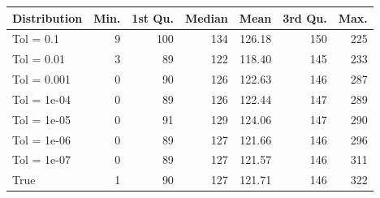 \begin{figure} 
\begin{tabular}{lrrrrrr}
 Distribution & Min. & 1st Qu. & Median & Mean & 3rd Qu. & Max. \\ 
  \hline
\hline
Tol =  0.1 & 9 & 100 & 134 & 126.18 & 150 & 225 \\ 
  Tol =  0.01 & 3 & 89 & 122 & 118.40 & 145 & 233 \\ 
  Tol =  0.001 & 0 & 90 & 126 & 122.63 & 146 & 287 \\ 
  Tol =  1e-04 & 0 & 89 & 126 & 122.44 & 147 & 289 \\ 
  Tol =  1e-05 & 0 & 91 & 129 & 124.06 & 147 & 290 \\ 
  Tol =  1e-06 & 0 & 89 & 127 & 121.66 & 146 & 296 \\ 
  Tol =  1e-07 & 0 & 89 & 127 & 121.57 & 146 & 311 \\ 
  True & 1 & 90 & 127 & 121.71 & 146 & 322 \\ 
  \end{tabular}
\label{tab:SummaryTable}
\end{figure} 
